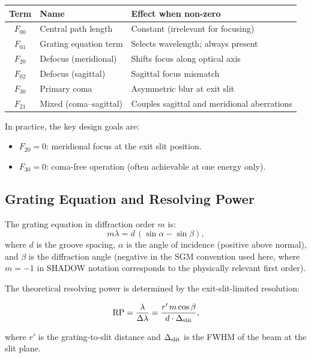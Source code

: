 \documentclass[12pt,a4paper]{article}
\newcommand{\al}{\alpha}
\newcommand{\be}{\beta}
\newcommand{\la}{\lambda}
\newcommand{\RP}{\mathrm{RP}}
\begin{document}
\begin{center}
\renewcommand{\arraystretch}{1.5}
\begin{tabular}{cll}
\toprule
\textbf{Term} & \textbf{Name} & \textbf{Effect when non-zero} \\
\midrule
$F_{00}$ & Central path length    & Constant (irrelevant for focusing) \\
$F_{01}$ & Grating equation term  & Selects wavelength; always present \\
$F_{20}$ & Defocus (meridional)   & Shifts focus along optical axis \\
$F_{02}$ & Defocus (sagittal)     & Sagittal focus mismatch \\
$F_{30}$ & Primary coma           & Asymmetric blur at exit slit \\
$F_{21}$ & Mixed (coma--sagittal) & Couples sagittal and meridional aberrations \\
\bottomrule
\end{tabular}
\end{center}

In practice, the key design goals are:
\begin{itemize}
  \item $F_{20} = 0$: meridional focus at the exit slit position.
  \item $F_{30} = 0$: coma-free operation (often achievable at one energy only).
\end{itemize}

\subsection{Grating Equation and Resolving Power}

The grating equation in diffraction order $m$ is:
\begin{equation}
  m\la = d\,(\sin\al - \sin\be),
  \label{eq:grating}
\end{equation}
where $d$ is the groove spacing, $\al$ is the angle of incidence (positive above normal),
and $\be$ is the diffraction angle (negative in the SGM convention used here, where
$m = -1$ in SHADOW notation corresponds to the physically relevant first order).

The theoretical resolving power is determined by the exit-slit-limited resolution:
\begin{keyresult}
\begin{equation}
  \RP = \frac{\la}{\Delta\la}
       = \frac{r'\,m\cos\be}{d\cdot\Delta_{\rm slit}},
  \label{eq:RP}
\end{equation}
\end{keyresult}
where $r'$ is the grating-to-slit distance and $\Delta_{\rm slit}$ is the FWHM of the
beam at the slit plane.
\end{document}
